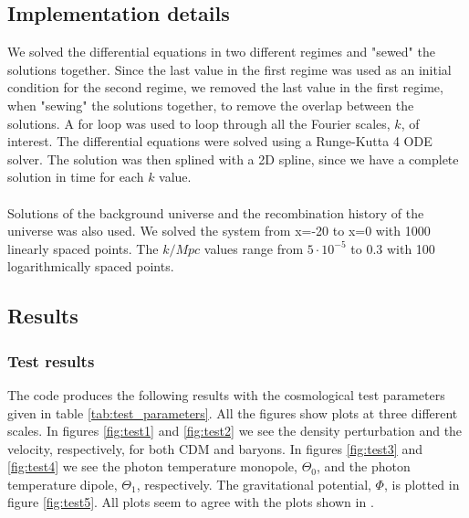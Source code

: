 \documentclass{aa}
\begin{document}
 


\subsection{Implementation details}
We solved the differential equations in two different regimes and "sewed" the solutions together.
Since the last value in the first regime was used as an initial condition for the second regime, we removed the last value 
in the first regime, when "sewing" the solutions together, to remove the overlap between the solutions. A for loop was used to loop through all the Fourier scales, $k$, of interest.
The differential equations were solved using a Runge-Kutta 4 ODE solver. The solution was then splined with a 2D spline, since we have a complete solution in time for each $k$ value.\\ \\
Solutions of the background universe and the recombination history of the universe was also used. We solved the system from x=-20 to x=0 with 1000 linearly spaced points.
The $k/Mpc$ values range from $5\cdot 10^{-5}$ to 0.3 with 100 logarithmically spaced points.

\subsection{Results}

\subsubsection{Test results}
The code produces the following results with the cosmological test parameters given in table \ref{tab:test_parameters}. All the figures show plots at three different scales.
In figures \ref{fig:test1} and \ref{fig:test2} we see the density perturbation and the velocity, respectively, for both CDM and baryons. In figures \ref{fig:test3}
and \ref{fig:test4} we see the photon temperature monopole, $\Theta_0$, and the photon temperature dipole, $\Theta_1$, respectively. The gravitational potential, $\Phi$, is plotted
in figure \ref{fig:test5}. All plots seem to agree with the plots shown in \cite{winther:2023}.   
\end{document}
